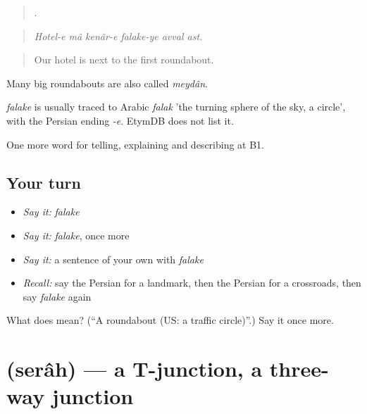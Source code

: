 \begin{quote}
     .
\end{quote}

\begin{quote}
\emph{Hotel-e mâ kenâr-e falake-ye avval ast.}
\end{quote}

\begin{quote}
Our hotel is next to the first roundabout.
\end{quote}

Many big roundabouts are also called \emph{meydân}.

\begin{cousinweb}
\emph{falake} is usually traced to Arabic \emph{falak} 'the turning sphere of the sky, a circle', with the Persian ending \emph{-e}. EtymDB does not list it.
\end{cousinweb}

\begin{grammarlens}[title={What you've built}]
One more word for telling, explaining and describing at B1.
\end{grammarlens}

\subsection*{Your turn}
\begin{itemize}
\raggedright
  \item \emph{Say it:} \emph{falake}
  \item \emph{Say it:} \emph{falake}, once more
  \item \emph{Say it:} a sentence of your own with \emph{falake}
  \item \emph{Recall:} say the Persian for a landmark, then the Persian for a crossroads, then say \emph{falake} again
\end{itemize}

\begin{tcolorbox}[breakable,colback=teal!4,colframe=teal!35!black,title={Before you move on}]
What does  mean? (\textquotedblleft{}A roundabout (US: a traffic circle)\textquotedblright{}.) Say it once more.
\end{tcolorbox}
\section[\texorpdfstring{\fa{سه} \fa{راه} (serâh)}{سه راه (serâh)}]{  (serâh) — a T-junction, a three-way junction}

